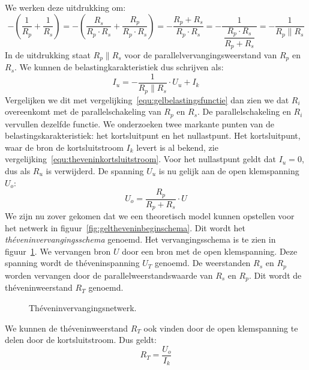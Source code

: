 %
We werken deze uitdrukking om:
%
\begin{equation}
- \left(\dfrac{1}{R_p}+\dfrac{1}{R_s}\right) = - \left(\dfrac{R_s}{R_p\cdot R_s}+\dfrac{R_p}{R_p\cdot R_s}\right) =
-\dfrac{R_p+R_s}{R_p\cdot R_s} = - \dfrac{1}{\ \dfrac{R_p\cdot R_s}{R_p+R_s}\ } = -\dfrac{1}{R_p \parallel R_s}
\end{equation}
%
In de uitdrukking staat $R_p \parallel R_s$ voor de parallelvervangingsweerstand van $R_p$ en $R_s$. We kunnen de
belastingkarakteristiek dus schrijven als:
%
\begin{equation}
I_u = -\dfrac{1}{R_p\parallel R_s}\cdot U_u + I_k
\end{equation}
%
Vergelijken we dit met vergelijking~\eqref{equ:gelbelastingsfunctie} dan zien we dat $R_i$ overeenkomt
met de parallelschakeling van $R_p$ en $R_s$. De parallelschakeling en $R_i$ vervullen dezelfde functie.
We onderzoeken twee markante punten van de belastingskarakteristiek: het kortsluitpunt en het nullastpunt.
Het kortsluitpunt, waar de bron de kortsluitstroom $I_k$ levert is al bekend, zie
vergelijking~\eqref{equ:theveninkortsluitstroom}. Voor het nullastpunt geldt dat $I_u = 0$, dus als $R_u$
is verwijderd. De spanning $U_u$ is nu gelijk aan de open klemspanning $U_o$:
%
\begin{equation}
U_o = \dfrac{R_p}{R_p+R_s}\cdot U
\end{equation}
%
We zijn nu zover gekomen dat we een theoretisch model kunnen opstellen voor het netwerk in
figuur~\ref{fig:geltheveninbeginschema}. Dit wordt het \textsl{th\'eveninvervangingsschema} genoemd. Het
vervangingsschema is
te zien in figuur~\ref{fig:geltheveninvervangingsschema}. We vervangen bron $U$ door een bron met de open
klemspanning. Deze spanning wordt de th\'eveninspanning $U_T$ genoemd. De weerstanden $R_s$ en $R_p$ worden
vervangen door de parallelweerstandswaarde van $R_s$ en $R_p$. Dit wordt de th\'eveninweerstand $R_T$
genoemd.

\begin{figure}[!ht]
\centering
{}
\captionsetup{width=.9\linewidth}
\caption{Th\'eveninvervangingsnetwerk.}
\label{fig:geltheveninvervangingsschema}
\end{figure}

We kunnen de th\'eveninweerstand $R_T$ ook vinden door de open klemspanning te delen door de kortsluitstroom.
Dus geldt:
%
\begin{equation}
R_T = \dfrac{U_o}{I_k}
\end{equation}

